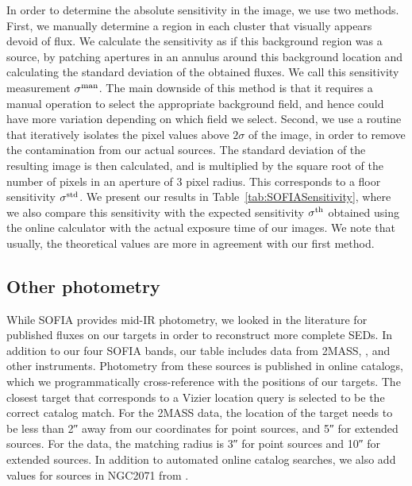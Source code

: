\begin{table}[!h]
\label{tab:SOFIASensitivity}
\end{table}

In order to determine the absolute sensitivity in the image, we use two methods. First, we manually determine a region in each cluster that visually appears devoid of flux. We calculate the sensitivity as if this background region was a source, by patching apertures in an annulus around this background location and calculating the standard deviation of the obtained fluxes. We call this sensitivity measurement $\sigma^\textrm{man}$. The main downside of this method is that it requires a manual operation to select the appropriate background field, and hence could have more variation depending on which field we select. Second, we use a routine that iteratively isolates the pixel values above $2\sigma$ of the image, in order to remove the contamination from our actual sources. The standard deviation of the resulting image is then calculated, and is multiplied by the square root of the number of pixels in an aperture of 3 pixel radius. This corresponds to a floor sensitivity $\sigma^\textrm{std}$. We present our results in Table~\ref{tab:SOFIASensitivity}, where we also compare this sensitivity with the expected sensitivity $\sigma^\textrm{th}$ obtained using the online calculator with the actual exposure time of our images. We note that usually, the theoretical values are more in agreement with our first method. 



\subsection{Other photometry}

While SOFIA provides mid-IR photometry, we looked in the literature for published fluxes on our targets in order to reconstruct more complete SEDs. In addition to our four SOFIA bands, our table includes data from 2MASS, \Spitzer, and other instruments. Photometry from these sources is published in online catalogs, which we programmatically cross-reference with the positions of our targets. The closest target that corresponds to a Vizier location query is selected to be the correct catalog match. For the 2MASS data, the location of the target needs to be less than \ang{;;2} away from our coordinates for point sources, and \ang{;;5} for extended sources. For the \Spitzer data, the matching radius is \ang{;;3} for point sources and \ang{;;10} for extended sources. In addition to automated online catalog searches, we also add values for sources in NGC2071 from \citet{vanKempen:2012fb}.

